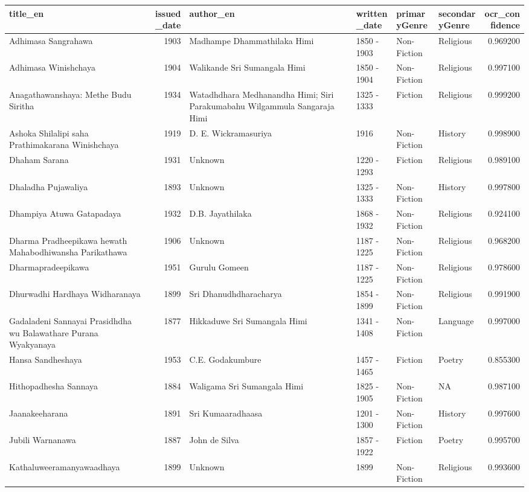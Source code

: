 \begin{tabular}{lrllllr}
\toprule
title_en & issued_date & author_en & written_date & primaryGenre & secondaryGenre & ocr_confidence \\
\midrule
Adhimasa Sangrahawa & 1903 & Madhampe Dhammathilaka Himi & 1850 - 1903 & Non-Fiction & Religious & 0.969200 \\
Adhimasa Winishchaya & 1904 & Walikande Sri Sumangala Himi & 1850 - 1904 & Non-Fiction & Religious & 0.997100 \\
Anagathawanshaya: Methe Budu Siritha & 1934 & Watadhdhara Medhanandha Himi; Siri Parakumabahu Wilgammula Sangaraja Himi & 1325 - 1333 & Fiction & Religious & 0.999200 \\
Ashoka Shilalipi saha Prathimakarana Winishchaya & 1919 & D. E. Wickramasuriya & 1916 & Non-Fiction & History & 0.998900 \\
Dhaham Sarana & 1931 & Unknown & 1220 - 1293 & Fiction & Religious & 0.989100 \\
Dhaladha Pujawaliya & 1893 & Unknown & 1325 - 1333 & Non-Fiction & History & 0.997800 \\
Dhampiya Atuwa Gatapadaya & 1932 & D.B. Jayathilaka & 1868 - 1932 & Non-Fiction & Religious & 0.924100 \\
Dharma Pradheepikawa hewath Mahabodhiwansha Parikathawa & 1906 & Unknown & 1187 - 1225 & Non-Fiction & Religious & 0.968200 \\
Dharmapradeepikawa & 1951 & Gurulu Gomeen & 1187 - 1225 & Non-Fiction & Religious & 0.978600 \\
Dhurwadhi Hardhaya Widharanaya & 1899 & Sri Dhanudhdharacharya & 1854 - 1899 & Non-Fiction & Religious & 0.991900 \\
Gadaladeni Sannayai Prasidhdha wu Balawathare Purana Wyakyanaya & 1877 & Hikkaduwe Sri Sumangala Himi & 1341 - 1408 & Non-Fiction & Language & 0.997000 \\
Hansa Sandheshaya & 1953 & C.E. Godakumbure & 1457 - 1465 & Fiction & Poetry & 0.855300 \\
Hithopadhesha Sannaya & 1884 & Waligama Sri Sumangala Himi & 1825 - 1905 & Non-Fiction & NA & 0.987100 \\
Jaanakeeharana & 1891 & Sri Kumaaradhaasa & 1201 - 1300 & Non-Fiction & History & 0.997600 \\
Jubili Warnanawa & 1887 & John de Silva & 1857 - 1922 & Fiction & Poetry & 0.995700 \\
Kathaluweeramanyawaadhaya & 1899 & Unknown & 1899 & Non-Fiction & Religious & 0.993600 \\

\end{tabular}
